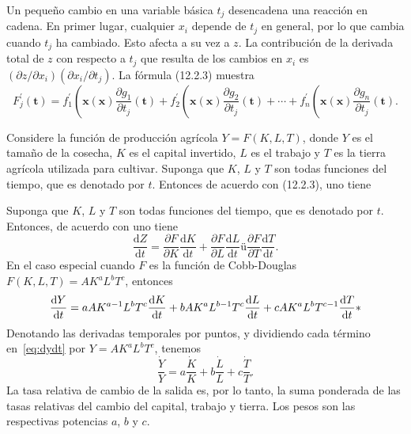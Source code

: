 Un pequeño cambio en una variable básica $t_{j}$ desencadena una reacción en cadena. En primer lugar, cualquier $x_{i}$ depende de $t_{j}$ en general, por lo que cambia cuando $t_{j}$ ha cambiado. Esto afecta a su vez a $z$. La contribución de la derivada total de $z$ con respecto a $t_{j}$ que resulta de los cambios en $x_{i}$ es $\left(\partial z/\partial x_{i}\right)\left(\partial x_{i}/\partial t_{j}\right)$. La fórmula (12.2.3) muestra \[ F^{\prime}_{j}\left(\bm{t}\right)=f^{\prime}_{1}\left(\bm{x}\left(\bm{x}\right)\frac{\partial g_{1}}{\partial t_{j}}\left(\bm{t}\right)+f^{\prime}_{2}\left(\bm{x}\left(\bm{x}\right)\frac{\partial g_{2}}{\partial t_{j}}\left(\bm{t}\right)+\cdots+f^{\prime}_{n}\left(\bm{x}\left(\bm{x}\right)\frac{\partial g_{n}}{\partial t_{j}}\left(\bm{t}\right). \]
\begin{frame}

\begin{example}
Considere la función de producción agrícola $Y=F\left(K,L,T\right)$, donde $Y$ es el tamaño de la cosecha, $K$ es el capital invertido, $L$ es el trabajo y $T$ es la tierra agrícola utilizada para cultivar. Suponga que $K$, $L$ y $ T$ son todas funciones del tiempo, que es denotado por $t$. Entonces de acuerdo con (12.2.3), uno tiene
\end{example}

\begin{example}
Suponga que $K$, $L$ y $T$ son todas funciones del tiempo, que es denotado por $t$. Entonces, de acuerdo con
uno tiene
\[ \dfrac{\mathrm{d}Z}{\mathrm{d}t}=\frac{\partial F}{\partial K}\frac{\mathrm{d}K}{\mathrm{d} t}+\frac{\partial F}{\partial L}\frac{\mathrm{d}L}{\mathrm{d}t}ü\frac{\partial F}{\partial T}\frac{\mathrm{d}T}{\mathrm{d}t}. \] En el caso especial cuando $F$ es la función de Cobb-Douglas $F\left(K,L,T\right)=AK^{a}L^{b}T^{c}$, entonces
\begin{equation}\label{eq:dydt}
\frac{\mathrm{d}Y}{\mathrm{d}t}=aAK^{a-1}L^{b}T^{c}\frac{\mathrm{d}K}{\mathrm{d}t}+bAK^{a}L^{b-1}T^{c}\frac{\mathrm{d}L}{\mathrm{d}t}+cAK^{a}L^{b}T^{c-1}\frac{\mathrm{d}T}{\mathrm{d}t}\notag{*}
\end{equation}
Denotando las derivadas temporales por puntos, y dividiendo cada término en~\eqref{eq:dydt} por $Y=AK^{a}L^{b}T^{c}$, tenemos \[ \frac{\dot{Y}}{Y}=a\frac{\dot{K}}{K}+b\frac{\dot{L}}{L}+c\frac{\dot{T}}{T}. \] La tasa relativa de cambio de la salida es, por lo tanto, la suma ponderada de las tasas relativas del cambio del capital, trabajo y tierra. Los pesos son las respectivas potencias $a$, $b$ y $c$.
\end{example}

\end{frame}

